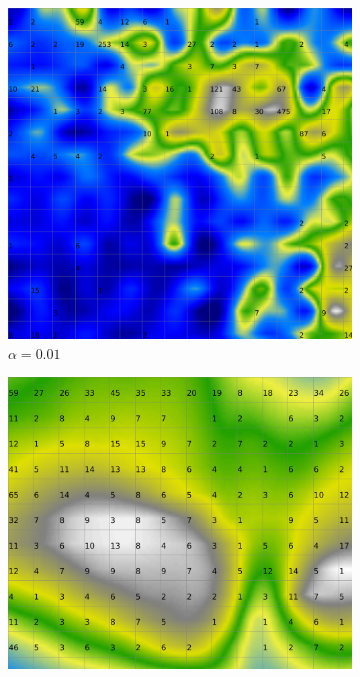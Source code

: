 \documentclass{acm_proc_article-sp}
\begin{document}
\begin{figure}
\centering
    \centering
    \begin{subfigure}[b]{0.24\linewidth}
        \includegraphics[width=\linewidth]{img/wine-20x16-smoothed-data-histogram-alpha-0,01-f-100}
        \caption{$\alpha=0.01$}
        \label{fig:wine-20x16-smoothed-data-histogram-alpha-0,01-f-100}
    \end{subfigure}
    \begin{subfigure}[b]{0.24\linewidth}
        \includegraphics[width=\linewidth]{img/wine-20x16-smoothed-data-histogram-alpha-0,45-f-100}

\end{subfigure}
\end{figure}
\end{document}
